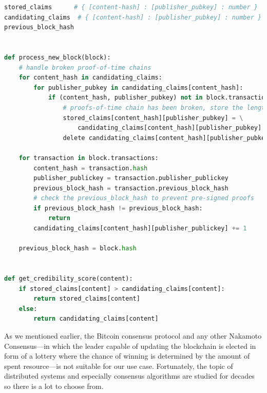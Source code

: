 \begin{lstlisting}[language=Python, caption=Processing new block, label=listing_process_new_block,float,floatplacement=H]
stored_claims      # { [content-hash] : [publisher_pubkey] : number }
candidating_claims  # { [content-hash] : [publisher_pubkey] : number }
previous_block_hash


def process_new_block(block):
    # handle broken proof-of-time chains
    for content_hash in candidating_claims:
        for publisher_pubkey in candidating_claims[content_hash]:
            if (content_hash, publisher_pubkey) not in block.transactions:
                # proofs-of-time chain has been broken, store the length
                stored_claims[content_hash][publisher_pubkey] = \
                    candidating_claims[content_hash][publisher_pubkey]
                delete candidating_claims[content_hash][publisher_pubkey]

    for transaction in block.transactions:
        content_hash = transaction.hash
        publisher_publickey = transaction.publisher_publickey
        previous_block_hash = transaction.previous_block_hash
        # check the previous_block_hash to prevent pre-signed proofs
        if previous_block_hash != previous_block_hash:
            return
        candidating_claims[content_hash][publisher_publickey] += 1

    previous_block_hash = block.hash


def get_credibility_score(content):
    if stored_claims[content] > candidating_claims[content]:
        return stored_claims[content]
    else:
        return candidating_claims[content]

\end{lstlisting}


As we mentioned earlier, the Bitcoin consensus protocol and any other Nakamoto Consensus––in which the leader capable of updating the blockchain is elected in form of a lottery where the chance of winning is determined by the amount of spent resource––is not suitable for our use case. Fortunately, the topic of distributed systems and especially consensus algorithms are studied for decades so there is a lot to choose from.

